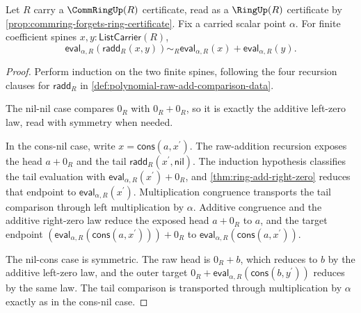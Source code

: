 \begin{lemma}
\label{lem:horner-evaluation-raw-additive}
Let $R$ carry a $\CommRingUp(R)$ certificate, read as a $\RingUp(R)$ certificate by \autoref{prop:commring-forgets-ring-certificate}. Fix a carried scalar point $\alpha$. For finite coefficient spines $x,y:\mathsf{ListCarrier}(R)$,
$$
\mathsf{eval}_{\alpha,R}(\mathsf{radd}_R(x,y))\sim_R
\mathsf{eval}_{\alpha,R}(x)+\mathsf{eval}_{\alpha,R}(y).
$$
\end{lemma}
\begin{proof}
Perform induction on the two finite spines, following the four recursion clauses for $\mathsf{radd}_R$ in \autoref{def:polynomial-raw-add-comparison-data}.

The nil-nil case compares $0_R$ with $0_R+0_R$, so it is exactly the additive left-zero law, read with symmetry when needed.

In the cons-nil case, write $x=\mathsf{cons}(a,x^\prime)$. The raw-addition recursion exposes the head $a+0_R$ and the tail $\mathsf{radd}_R(x^\prime,\mathsf{nil})$. The induction hypothesis classifies the tail evaluation with $\mathsf{eval}_{\alpha,R}(x^\prime)+0_R$, and \autoref{thm:ring-add-right-zero} reduces that endpoint to $\mathsf{eval}_{\alpha,R}(x^\prime)$. Multiplication congruence transports the tail comparison through left multiplication by $\alpha$. Additive congruence and the additive right-zero law reduce the exposed head $a+0_R$ to $a$, and the target endpoint $(\mathsf{eval}_{\alpha,R}(\mathsf{cons}(a,x^\prime)))+0_R$ to $\mathsf{eval}_{\alpha,R}(\mathsf{cons}(a,x^\prime))$.

The nil-cons case is symmetric. The raw head is $0_R+b$, which reduces to $b$ by the additive left-zero law, and the outer target $0_R+\mathsf{eval}_{\alpha,R}(\mathsf{cons}(b,y^\prime))$ reduces by the same law. The tail comparison is transported through multiplication by $\alpha$ exactly as in the cons-nil case.


\end{proof}
